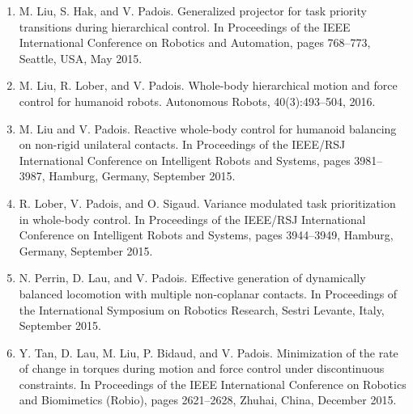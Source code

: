 \begin{enumerate}
\item M. Liu, S. Hak, and V. Padois. Generalized projector for task priority transitions during hierarchical control. In Proceedings of the IEEE International Conference on Robotics and Automation, pages 768–773, Seattle, USA, May 2015.

\item M. Liu, R. Lober, and V. Padois. Whole-body hierarchical motion and force control for humanoid robots. Autonomous Robots, 40(3):493–504, 2016.

\item M. Liu and V. Padois. Reactive whole-body control for humanoid balancing on non-rigid unilateral contacts. In Proceedings of the IEEE/RSJ International Conference on Intelligent Robots and Systems, pages 3981–3987, Hamburg, Germany, September 2015.

\item R. Lober, V. Padois, and O. Sigaud. Variance modulated task prioritization in whole-body control. In Proceedings of the IEEE/RSJ International Conference on Intelligent Robots and Systems, pages 3944–3949, Hamburg, Germany, September 2015.

\item N. Perrin, D. Lau, and V. Padois. Effective generation of dynamically balanced locomotion with multiple non-coplanar contacts. In Proceedings of the International Symposium on Robotics Research, Sestri Levante, Italy,
September 2015.

\item Y. Tan, D. Lau, M. Liu, P. Bidaud, and V. Padois. Minimization of the rate of change in torques during motion and force control under discontinuous constraints. In Proceedings of the IEEE International Conference on Robotics and Biomimetics (Robio), pages 2621–2628, Zhuhai, China, December 2015.
\end{enumerate}
	
